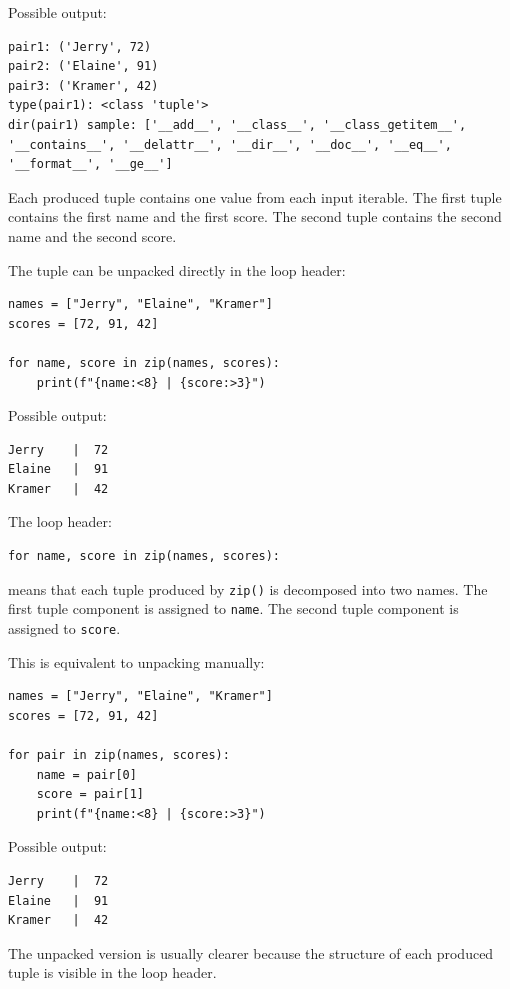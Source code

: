 \documentclass[a4paper,twoside]{report}
\begin{document}
Possible output:

\begin{verbatim}
pair1: ('Jerry', 72)
pair2: ('Elaine', 91)
pair3: ('Kramer', 42)
type(pair1): <class 'tuple'>
dir(pair1) sample: ['__add__', '__class__', '__class_getitem__',
'__contains__', '__delattr__', '__dir__', '__doc__', '__eq__',
'__format__', '__ge__']
\end{verbatim}

Each produced tuple contains one value from each input iterable. The first tuple contains the first name and the first score. The second tuple contains the second name and the second score.

The tuple can be unpacked directly in the loop header:

\begin{verbatim}
names = ["Jerry", "Elaine", "Kramer"]
scores = [72, 91, 42]

for name, score in zip(names, scores):
    print(f"{name:<8} | {score:>3}")
\end{verbatim}

Possible output:

\begin{verbatim}
Jerry    |  72
Elaine   |  91
Kramer   |  42
\end{verbatim}

The loop header:

\begin{verbatim}
for name, score in zip(names, scores):
\end{verbatim}

means that each tuple produced by \texttt{zip()} is decomposed into two names. The first tuple component is assigned to \texttt{name}. The second tuple component is assigned to \texttt{score}.

This is equivalent to unpacking manually:

\begin{verbatim}
names = ["Jerry", "Elaine", "Kramer"]
scores = [72, 91, 42]

for pair in zip(names, scores):
    name = pair[0]
    score = pair[1]
    print(f"{name:<8} | {score:>3}")
\end{verbatim}

Possible output:

\begin{verbatim}
Jerry    |  72
Elaine   |  91
Kramer   |  42
\end{verbatim}

The unpacked version is usually clearer because the structure of each produced tuple is visible in the loop header.
\end{document}
